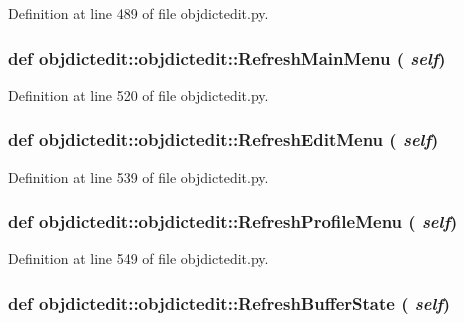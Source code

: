 Definition at line 489 of file objdictedit.py.\hypertarget{classobjdictedit_1_1objdictedit_adc9eb58dc3ff58afd5ff7451a62923d}{
\subsubsection[RefreshMainMenu]{\setlength{\rightskip}{0pt plus 5cm}def objdictedit::objdictedit::Refresh\-Main\-Menu ( {\em self})}}
\label{classobjdictedit_1_1objdictedit_adc9eb58dc3ff58afd5ff7451a62923d}




Definition at line 520 of file objdictedit.py.\hypertarget{classobjdictedit_1_1objdictedit_2b33b17be4ab0796b701fc916fcf7e64}{
\subsubsection[RefreshEditMenu]{\setlength{\rightskip}{0pt plus 5cm}def objdictedit::objdictedit::Refresh\-Edit\-Menu ( {\em self})}}
\label{classobjdictedit_1_1objdictedit_2b33b17be4ab0796b701fc916fcf7e64}




Definition at line 539 of file objdictedit.py.\hypertarget{classobjdictedit_1_1objdictedit_d9fcd386d41eff2b5f7475c7c4e2e501}{
\subsubsection[RefreshProfileMenu]{\setlength{\rightskip}{0pt plus 5cm}def objdictedit::objdictedit::Refresh\-Profile\-Menu ( {\em self})}}
\label{classobjdictedit_1_1objdictedit_d9fcd386d41eff2b5f7475c7c4e2e501}




Definition at line 549 of file objdictedit.py.\hypertarget{classobjdictedit_1_1objdictedit_be28bc389ae846a97daba676fbe064db}{
\subsubsection[RefreshBufferState]{\setlength{\rightskip}{0pt plus 5cm}def objdictedit::objdictedit::Refresh\-Buffer\-State ( {\em self})}}
\label{classobjdictedit_1_1objdictedit_be28bc389ae846a97daba676fbe064db}




